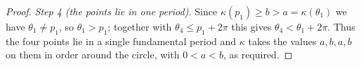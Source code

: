 \begin{proof}
  \emph{Step 4 (the points lie in one period).} Since $\kappa(p_1) \ge b > a =
  \kappa(\theta_1)$ we have $\theta_1 \ne p_1$, so $\theta_1 > p_1$; together with
  $\theta_4 \le p_1 + 2\pi$ this gives $\theta_4 < \theta_1 + 2\pi$. Thus the four
  points lie in a single fundamental period and $\kappa$ takes the values
  $a, b, a, b$ on them in order around the circle, with $0 < a < b$, as required.
\end{proof}

